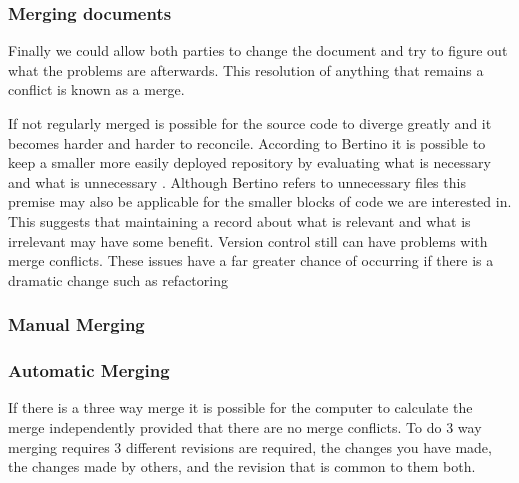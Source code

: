 \subsubsection{Merging documents}
Finally we could allow both parties to change the document and try to figure out what the problems are afterwards.  This resolution of anything that remains a conflict is known as a merge.

If not regularly merged is possible for the source code to diverge greatly and it becomes harder and harder to reconcile.
 According to Bertino it is possible to keep a smaller more easily deployed repository by evaluating what is necessary and what is unnecessary \cite{Bertino2012}. Although Bertino refers to unnecessary files this premise may also be applicable for the smaller blocks of code we are interested in. This suggests that maintaining a record about what is relevant and what is irrelevant may have some benefit. Version control still can have problems with merge conflicts. These issues have a far greater chance of occurring if there is a dramatic change such as refactoring
 
\subsubsection{Manual Merging}


% 
% 

\subsubsection{Automatic Merging}
If there is a three way merge it is possible for the computer to calculate the merge independently provided that there are no merge conflicts.
To do 3 way merging requires 3 different revisions are required, the changes you have made, the changes made by others, and the revision that is common to them both.



